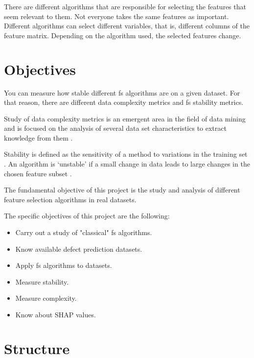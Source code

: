 There are different algorithms that are responsible for selecting the features that seem relevant to them. Not everyone takes the same features as important. Different algorithms can select different variables, that is, different columns of the feature matrix. Depending on the algorithm used, the selected features change.

\section{Objectives}
\label{sec:objectives}

You can measure how stable different \acrshort{fs} algorithms are on a given dataset. For that reason, there are different data complexity metrics and \acrshort{fs} stability metrics.

Study of data complexity metrics is an emergent area in the field of data mining and is focused on the analysis of several data set characteristics to extract knowledge from them \cite{CANO20134820}.

Stability is defined as the sensitivity of a method to variations in the training set \cite{Kalousis2007}. An algorithm is `unstable' if a small change in data leads to large changes in the chosen feature subset \cite{JMLR2018}.

The fundamental objective of this project is the study and analysis of different feature selection algorithms in real datasets.

The specific objectives of this project are the following:

\begin{itemize}
    \item Carry out a study of "classical" \acrshort{fs} algorithms.
    \item Know available defect prediction datasets.
    \item Apply \acrshort{fs} algorithms to datasets.
    \item Measure stability.
    \item Measure complexity.
    \item Know about SHAP values.
\end{itemize}

\section{Structure}
\label{sec:structure}

